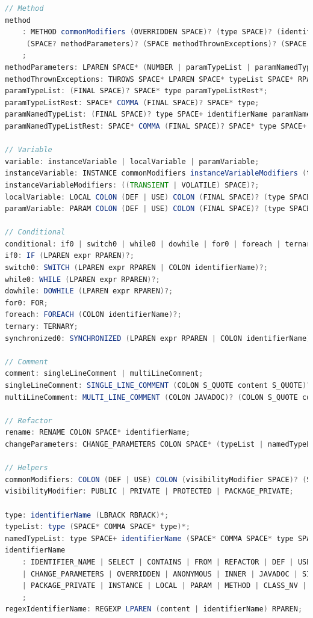 \documentclass[12pt, letterpaper]{article}
\begin{document}
\begin{lstlisting}[language=Java]
// Method
method
    : METHOD commonModifiers (OVERRIDDEN SPACE)? (type SPACE)? (identifierName | regexIdentifierName)
     (SPACE? methodParameters)? (SPACE methodThrownExceptions)? (SPACE SUPER SPACE* superClassList)?
    ;
methodParameters: LPAREN SPACE* (NUMBER | paramTypeList | paramNamedTypeList) SPACE* RPAREN;
methodThrownExceptions: THROWS SPACE* LPAREN SPACE* typeList SPACE* RPAREN;
paramTypeList: (FINAL SPACE)? SPACE* type paramTypeListRest*;
paramTypeListRest: SPACE* COMMA (FINAL SPACE)? SPACE* type;
paramNamedTypeList: (FINAL SPACE)? type SPACE+ identifierName paramNamedTypeListRest*;
paramNamedTypeListRest: SPACE* COMMA (FINAL SPACE)? SPACE* type SPACE+ identifierName;

// Variable
variable: instanceVariable | localVariable | paramVariable;
instanceVariable: INSTANCE commonModifiers instanceVariableModifiers (type SPACE)? identifierName;
instanceVariableModifiers: ((TRANSIENT | VOLATILE) SPACE)?;
localVariable: LOCAL COLON (DEF | USE) COLON (FINAL SPACE)? (type SPACE)? identifierName;
paramVariable: PARAM COLON (DEF | USE) COLON (FINAL SPACE)? (type SPACE)? identifierName;

// Conditional
conditional: if0 | switch0 | while0 | dowhile | for0 | foreach | ternary | synchronized0;
if0: IF (LPAREN expr RPAREN)?;
switch0: SWITCH (LPAREN expr RPAREN | COLON identifierName)?;
while0: WHILE (LPAREN expr RPAREN)?;
dowhile: DOWHILE (LPAREN expr RPAREN)?;
for0: FOR;
foreach: FOREACH (COLON identifierName)?;
ternary: TERNARY;
synchronized0: SYNCHRONIZED (LPAREN expr RPAREN | COLON identifierName)?;

// Comment
comment: singleLineComment | multiLineComment;
singleLineComment: SINGLE_LINE_COMMENT (COLON S_QUOTE content S_QUOTE)?;
multiLineComment: MULTI_LINE_COMMENT (COLON JAVADOC)? (COLON S_QUOTE content S_QUOTE)?;

// Refactor
rename: RENAME COLON SPACE* identifierName;
changeParameters: CHANGE_PARAMETERS COLON SPACE* (typeList | namedTypeList);

// Helpers
commonModifiers: COLON (DEF | USE) COLON (visibilityModifier SPACE)? (STATIC SPACE)? (FINAL SPACE)?;
visibilityModifier: PUBLIC | PRIVATE | PROTECTED | PACKAGE_PRIVATE;

type: identifierName (LBRACK RBRACK)*;
typeList: type (SPACE* COMMA SPACE* type)*;
namedTypeList: type SPACE+ identifierName (SPACE* COMMA SPACE* type SPACE+ identifierName)*;
identifierName
    : IDENTIFIER_NAME | SELECT | CONTAINS | FROM | REFACTOR | DEF | USE | AND | OR | NOT | DOWHILE | TERNARY | RENAME
    | CHANGE_PARAMETERS | OVERRIDDEN | ANONYMOUS | INNER | JAVADOC | SINGLE_LINE_COMMENT | MULTI_LINE_COMMENT
    | PACKAGE_PRIVATE | INSTANCE | LOCAL | PARAM | METHOD | CLASS_NV | REGEXP
    ;
regexIdentifierName: REGEXP LPAREN (content | identifierName) RPAREN;


\end{lstlisting}
\end{document}
